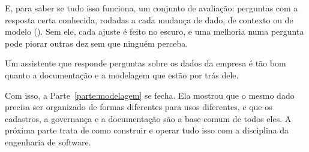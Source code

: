 E, para saber se tudo isso funciona, um conjunto de avaliação: perguntas com a resposta
certa conhecida, rodadas a cada mudança de dado, de contexto ou de modelo
(). Sem ele, cada ajuste é feito no escuro, e uma melhoria numa
pergunta pode piorar outras dez sem que ninguém perceba.

\begin{destaque}
Um assistente que responde perguntas sobre os dados da empresa é tão bom quanto a
documentação e a modelagem que estão por trás dele.
\end{destaque}


Com isso, a Parte~\ref{parte:modelagem} se fecha. Ela mostrou que o mesmo dado precisa ser
organizado de formas diferentes para usos diferentes, e que os cadastros, a governança e a
documentação são a base comum de todos eles. A próxima parte trata de como construir e operar
tudo isso com a disciplina da engenharia de software.

\begin{leituras}
\end{leituras}
